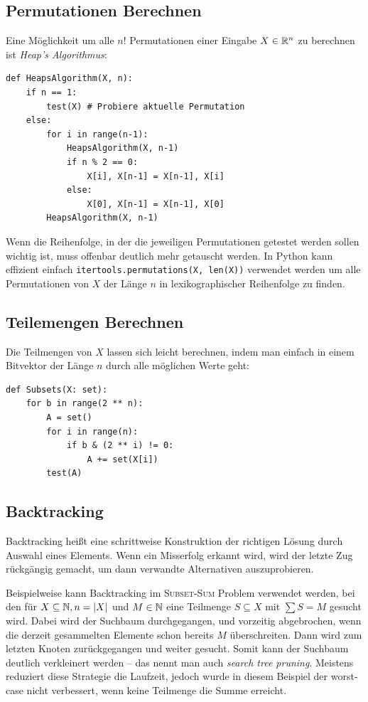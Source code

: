 \subsection{Permutationen Berechnen}
Eine Möglichkeit um alle \(n!\) Permutationen einer Eingabe \(X \in \mathbb R^n\) zu berechnen ist \emph{Heap's Algorithmus}:
\begin{lstlisting}
def HeapsAlgorithm(X, n):
    if n == 1:
        test(X) # Probiere aktuelle Permutation
    else:
        for i in range(n-1):
            HeapsAlgorithm(X, n-1)
            if n % 2 == 0:
                X[i], X[n-1] = X[n-1], X[i]
            else:
                X[0], X[n-1] = X[n-1], X[0]
        HeapsAlgorithm(X, n-1)
\end{lstlisting}
Wenn die Reihenfolge, in der die jeweiligen Permutationen getestet werden sollen wichtig ist, muss offenbar deutlich mehr getauscht werden.
In Python kann effizient einfach \lstinline|itertools.permutations(X, len(X))| verwendet werden um alle Permutationen von \(X\) der Länge \(n\) in lexikographischer Reihenfolge zu finden.

\subsection{Teilemengen Berechnen}
Die Teilmengen von \(X\) lassen sich leicht berechnen, indem man einfach in einem Bitvektor der Länge \(n\) durch alle möglichen Werte geht:
\begin{lstlisting}
def Subsets(X: set):
    for b in range(2 ** n):
        A = set()
        for i in range(n):
            if b & (2 ** i) != 0:
                A += set(X[i])
        test(A)
\end{lstlisting}

\subsection{Backtracking}
Backtracking heißt eine schrittweise Konstruktion der richtigen Lösung durch Auswahl eines Elements.
Wenn ein Misserfolg erkannt wird, wird der letzte Zug rückgängig gemacht, um dann verwandte Alternativen auszuprobieren.

Beispielweise kann Backtracking im \textsc{Subset-Sum} Problem verwendet werden, bei den für \(X \subseteq \mathbb N, n = |X|\) und \(M \in \mathbb N\) eine Teilmenge \(S \subseteq X\) mit \(\sum S = M\) gesucht wird.
Dabei wird der Suchbaum durchgegangen, und vorzeitig abgebrochen, wenn die derzeit gesammelten Elemente schon bereits \(M\) überschreiten.
Dann wird zum letzten Knoten zurückgegangen und weiter gesucht.
Somit kann der Suchbaum deutlich verkleinert werden -- das nennt man auch \emph{search tree pruning}.
Meistens reduziert diese Strategie die Laufzeit, jedoch wurde in diesem Beispiel der worst-case nicht verbessert, wenn keine Teilmenge die Summe erreicht.

